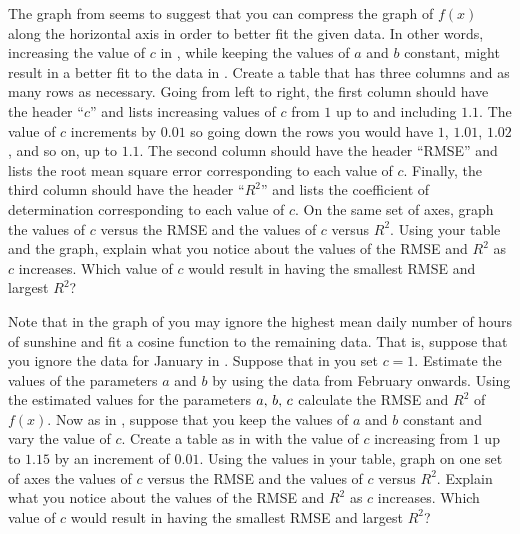 \documentclass[a4paper,oneside,12pt]{article}
\begin{document}
\begin{problem}
\begin{packedenum}
  \item\label{subprob:trigonometric:mean_daily_sunshine_compress}
    The graph
    from  seems
    to suggest that you can compress the graph of $f(x)$ along the
    horizontal axis in order to better fit the given data.  In other
    words, increasing the value of $c$ in
    , while keeping
    the values of $a$ and $b$ constant, might result in a better fit
    to the data in .
    Create a table that has three columns and as many rows as
    necessary.  Going from left to right, the first column should have
    the header ``$c$'' and lists increasing values of $c$ from $1$ up
    to and including $1.1$.  The value of $c$ increments by $0.01$ so
    going down the rows you would have $1$, $1.01$, $1.02$, and so on,
    up to $1.1$.  The second column should have the header ``RMSE''
    and lists the root mean square error corresponding to each value
    of $c$.  Finally, the third column should have the header
    ``$R^2$'' and lists the coefficient of determination corresponding
    to each value of $c$.  On the same set of axes, graph the values
    of $c$ versus the RMSE and the values of $c$ versus $R^2$.  Using
    your table and the graph, explain what you notice about the values
    of the RMSE and $R^2$ as $c$ increases.  Which value of $c$ would
    result in 
    having the smallest RMSE and largest $R^2$?

  \item\label{subprob:trigonometric:mean_daily_sunshine_remove_highest}
    Note that in the graph
    of  you may
    ignore the highest mean daily number of hours of sunshine and fit
    a cosine function to the remaining data.  That is, suppose that
    you ignore the data for January in
    .  Suppose that in
     you set
    $c = 1$.  Estimate the values of the parameters $a$ and $b$ by
    using the data from February onwards.  Using the estimated values
    for the parameters ${a},\, {b},\, {c}$ calculate the RMSE and $R^2$
    of $f(x)$.  Now as
    in ,
    suppose that you keep the values of $a$ and $b$ constant and vary
    the value of $c$.  Create a table as
    in  with
    the value of $c$ increasing from $1$ up to $1.15$ by an increment
    of $0.01$.  Using the values in your table, graph on one set of
    axes the values of $c$ versus the RMSE and the values of $c$
    versus $R^2$.  Explain what you notice about the values of the
    RMSE and $R^2$ as $c$ increases.  Which value of $c$ would result
    in  having the
    smallest RMSE and largest $R^2$?


\end{packedenum}
\end{problem}
\end{document}
